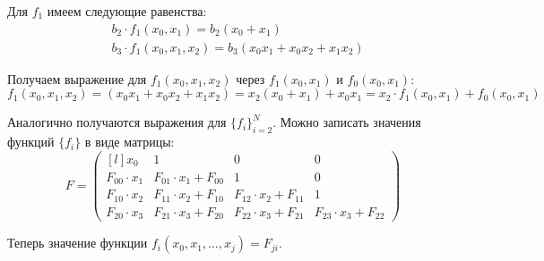 \documentclass[fleqn]{article}
\begin{document}
Для $f_1$ имеем следующие равенства:
\begin{align*}
	&b_2 \cdot f_1(x_0, x_1) = b_2 (x_0 + x_1)\\
	&b_3 \cdot f_1(x_0, x_1, x_2) = b_3 (x_0 x_1 + x_0 x_2 + x_1 x_2)
\end{align*}

Получаем выражение для $f_1(x_0, x_1, x_2)$ через $f_1(x_0, x_1)$ и $f_0(x_0, x_1)$:
\[ f_1(x_0, x_1, x_2) = (x_0 x_1 + x_0 x_2 + x_1 x_2) = x_2 (x_0 + x_1) + x_0 x_1 = x_2 \cdot f_1(x_0, x_1) + f_0(x_0, x_1) \]

Аналогично получаются выражения для $\{f_i\}_{i=2}^N$.
Можно записать значения функций $\{f_i\}$ в виде матрицы:
\[
	F = 
\begin{pmatrix*}[l]
	x_0					& 1									& 0									& 0\\
	F_{00} \cdot x_1	& F_{01} \cdot x_1 + F_{00}	& 1									& 0\\
	F_{10} \cdot x_2	& F_{11} \cdot x_2 + F_{10}	& F_{12} \cdot x_2 + F_{11}	& 1\\
	F_{20} \cdot x_3	& F_{21} \cdot x_3 + F_{20}	& F_{22} \cdot x_3 + F_{21}	& F_{23} \cdot x_3 + F_{22}
\end{pmatrix*}
\]

Теперь значение функции $f_i(x_0, x_1, \ldots , x_j) = F_{ji}$.
\end{document}
